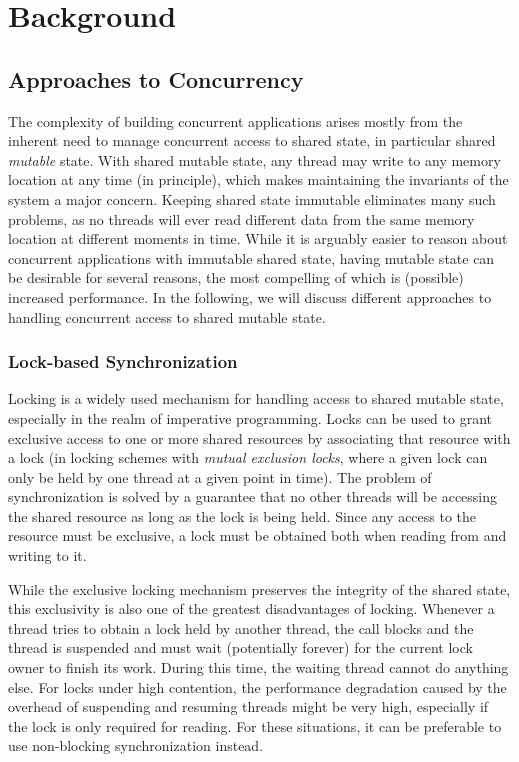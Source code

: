 \section{Background}
\label{sec:background}

\subsection{Approaches to Concurrency}
The complexity of building concurrent applications arises mostly from the inherent need to manage concurrent access to shared state, in particular shared \emph{mutable} state. With shared mutable state, any thread may write to any memory location at any time (in principle), which makes maintaining the invariants of the system a major concern. Keeping shared state immutable eliminates many such problems, as no threads will ever read different data from the same memory location at different moments in time. While it is arguably easier to reason about concurrent applications with immutable shared state, having mutable state can be desirable for several reasons, the most compelling of which is (possible) increased performance. In the following, we will discuss different approaches to handling concurrent access to shared mutable state.

\subsubsection{Lock-based Synchronization}
Locking is a widely used mechanism for handling access to shared mutable state, especially in the realm of imperative programming. Locks can be used to grant exclusive access to one or more shared resources by associating that resource with a lock (in locking schemes with \emph{mutual exclusion locks}, where a given lock can only be held by one thread at a given point in time). The problem of synchronization is solved by a guarantee that no other threads will be accessing the shared resource as long as the lock is being held. Since any access to the resource must be exclusive, a lock must be obtained both when reading from and writing to it. 

While the exclusive locking mechanism preserves the integrity of the shared state, this exclusivity is also one of the greatest disadvantages of locking. Whenever a thread tries to obtain a lock held by another thread, the call blocks and the thread is suspended and must wait (potentially forever) for the current lock owner to finish its work. During this time, the waiting thread cannot do anything else. For locks under high contention, the performance degradation caused by the overhead of suspending and resuming threads might be very high, especially if the lock is only required for reading. For these situations, it can be preferable to use non-blocking synchronization instead.

